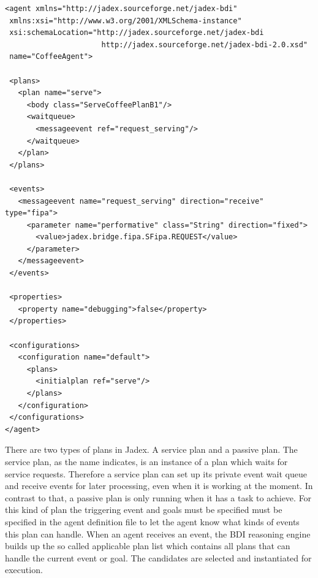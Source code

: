 \begin{lstlisting}
<agent xmlns="http://jadex.sourceforge.net/jadex-bdi"
 xmlns:xsi="http://www.w3.org/2001/XMLSchema-instance"
 xsi:schemaLocation="http://jadex.sourceforge.net/jadex-bdi
                      http://jadex.sourceforge.net/jadex-bdi-2.0.xsd"
 name="CoffeeAgent">

 <plans>
   <plan name="serve">
     <body class="ServeCoffeePlanB1"/>
     <waitqueue>
       <messageevent ref="request_serving"/>
     </waitqueue>
   </plan>
 </plans>

 <events>
   <messageevent name="request_serving" direction="receive" type="fipa">
     <parameter name="performative" class="String" direction="fixed">
       <value>jadex.bridge.fipa.SFipa.REQUEST</value>
     </parameter>
   </messageevent>
 </events>

 <properties>
   <property name="debugging">false</property>
 </properties>

 <configurations>
   <configuration name="default">
     <plans>
       <initialplan ref="serve"/>
     </plans>
   </configuration>
 </configurations>
</agent>
\end{lstlisting}
There are two types of plans in Jadex. A service plan and a passive plan. The service plan, as the name indicates, is an instance of a plan which waits for service requests. Therefore a service plan  can set up its private event wait queue and receive events for later processing, even when it is working at the moment. In contrast to that, a passive plan is only running when it has a task to achieve. For this kind of plan the triggering event and goals must be specified must be specified in the agent definition file to let the agent know what kinds of events this plan can handle. When an agent receives an event, the BDI reasoning engine builds up the so called applicable plan list which contains all plans that can handle the current event or goal. The candidates are selected and instantiated for execution.

